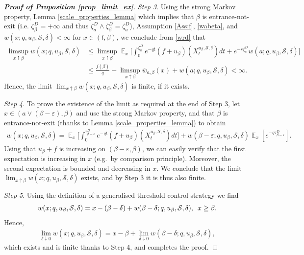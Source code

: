 \documentclass[11pt]{article} %
\DeclareMathOperator{\E}{\mathbb E}
\numberwithin{komcounter}{section}
\newcommand{\ol}{\overline}
\renewcommand{\epsilon}{\varepsilon}
\begin{document}
\begin{proof}[\bf Proof of Proposition \ref{prop_limit_ex}]
\vspace{1mm}
{\it Step 3}. 
Using the strong Markov property, Lemma \ref{scale_properties_lemma} which implies that $\beta$ is entrance-not-exit (i.e. $\zeta^D_\beta=+\infty$ and thus $\zeta^D_a \wedge \zeta^D_\beta = \zeta^D_a$), Assumption \ref{Ass:f}, \eqref{wabeta}, and $w(x;q,u_\beta,\mathcal{S},\delta)<\infty$ for $x\in (l,\beta)$, 
we conclude from \eqref{wrd} that 
\begin{align*}
\limsup_{x\uparrow \beta} w(x;q,u_\beta,\mathcal{S},\delta) 
&\leq \limsup_{x\uparrow \beta} \E_x\bigg[ \int_0^{\zeta^D_a} e^{-qt} ( f + u_\beta)(X^{u_\beta,\mathcal{S},\delta}_t) dt %
+ e^{-r \zeta^D_a} w(a;q,u_\beta,\mathcal{S},\delta) \bigg] \\
&\leq
\frac{f(\beta)}{q}+
\limsup_{x\uparrow \beta} \ol{w}_{a,\beta}(x) + 
w(a;q,u_\beta,\mathcal{S},\delta) 
<\infty.
\end{align*}
Hence, the limit $\lim_{x\uparrow \beta}w(x;q,u_\beta,\mathcal{S},\delta)$ is finite, if it exists. 

\vspace{1mm}
{\it Step 4}.
To prove the existence of the limit as required at the end of Step 3, let $x\in ( a \vee (\beta-\epsilon),\beta)$ and use the strong Markov property, and that $\beta$ is entrance-not-exit (thanks to Lemma \ref{scale_properties_lemma}) to obtain 
\begin{align*}
w(x;q,u_\beta,\mathcal{S},\delta)
= \E_x \bigg[ \int_0^{\tau^D_{\beta-\epsilon}} e^{-qt} (f + u_\beta)(X^{u_\beta,\mathcal{S},\delta}_t) dt \bigg] 
+ w(\beta-\epsilon;q,u_\beta,\mathcal{S},\delta) \E_x\left[ e^{-q \tau^D_{\beta-\epsilon}} \right].
\end{align*}
Using that $u_\beta + f$ is increasing on $(\beta-\epsilon,\beta)$, we can easily verify that the first expectation is increasing in $x$ (e.g.~by comparison principle). Moreover, the second expectation is bounded and decreasing in $x$. We conclude that the limit $\lim_{x\uparrow \beta}w(x;q,u_\beta,\mathcal{S},\delta)$ exists, and by Step 3 it is thus also finite. 

\vspace{1mm}
{\it Step 5}. Using the definition of a generalised threshold control strategy we find 
\begin{align*}
w(x;q,u_\beta,\mathcal{S},\delta)=x-(\beta-\delta) + w(\beta-\delta;q,u_\beta,\mathcal{S},\delta), \enskip x \geq \beta.
\end{align*}
Hence,
\begin{align*}
\lim_{\delta\downarrow 0} w(x;q,u_\beta,\mathcal{S},\delta)=x-\beta + \lim_{\delta\downarrow 0} w(\beta-\delta;q,u_\beta,\mathcal{S},\delta),
\end{align*}
which exists and is finite thanks to Step 4, and completes the proof.
\end{proof}
    
\end{document}
